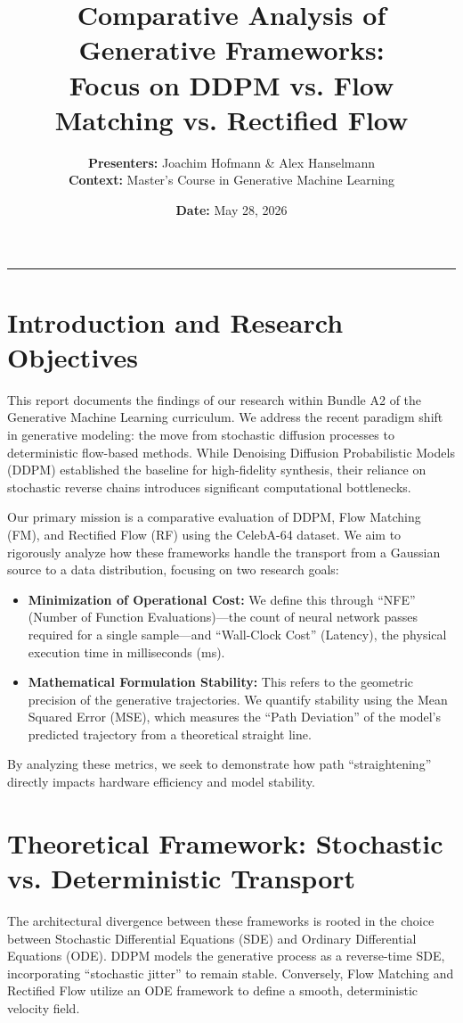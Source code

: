 \documentclass[11pt,a4paper]{article}
\title{\textbf{Comparative Analysis of Generative Frameworks:\\ Focus on DDPM vs. Flow Matching vs. Rectified Flow}}
\author{\textbf{Presenters:} Joachim Hofmann \& Alex Hanselmann \\
\small \textbf{Context:} Master's Course in Generative Machine Learning}
\date{\textbf{Date:} May 28, 2026}
\begin{document}
\maketitle

\hrule
\vspace{0.4cm}

\section{Introduction and Research Objectives}
This report documents the findings of our research within Bundle A2 of the Generative Machine Learning curriculum. We address the recent paradigm shift in generative modeling: the move from stochastic diffusion processes to deterministic flow-based methods. While Denoising Diffusion Probabilistic Models (DDPM) established the baseline for high-fidelity synthesis, their reliance on stochastic reverse chains introduces significant computational bottlenecks.

Our primary mission is a comparative evaluation of DDPM, Flow Matching (FM), and Rectified Flow (RF) using the CelebA-64 dataset. We aim to rigorously analyze how these frameworks handle the transport from a Gaussian source to a data distribution, focusing on two research goals:
\begin{itemize}
    \item \textbf{Minimization of Operational Cost:} We define this through ``NFE'' (Number of Function Evaluations)---the count of neural network passes required for a single sample---and ``Wall-Clock Cost'' (Latency), the physical execution time in milliseconds (ms).
    \item \textbf{Mathematical Formulation Stability:} This refers to the geometric precision of the generative trajectories. We quantify stability using the Mean Squared Error (MSE), which measures the ``Path Deviation'' of the model's predicted trajectory from a theoretical straight line.
\end{itemize}
By analyzing these metrics, we seek to demonstrate how path ``straightening'' directly impacts hardware efficiency and model stability.

\section{Theoretical Framework: Stochastic vs. Deterministic Transport}
The architectural divergence between these frameworks is rooted in the choice between Stochastic Differential Equations (SDE) and Ordinary Differential Equations (ODE). DDPM models the generative process as a reverse-time SDE, incorporating ``stochastic jitter'' to remain stable. Conversely, Flow Matching and Rectified Flow utilize an ODE framework to define a smooth, deterministic velocity field.
\end{document}
